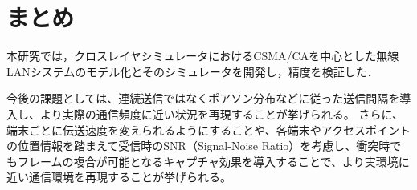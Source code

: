 \documentclass[a4paper, 10pt]{ltjsarticle}
\begin{document}
\vspace{-2em}

\section{まとめ}

本研究では，クロスレイヤシミュレータにおけるCSMA/CAを中心とした無線LANシステムのモデル化とそのシミュレータを開発し，精度を検証した．

今後の課題としては、連続送信ではなくポアソン分布などに従った送信間隔を導入し、より実際の通信頻度に近い状況を再現することが挙げられる。
さらに、端末ごとに伝送速度を変えられるようにすることや、各端末やアクセスポイントの位置情報を踏まえて受信時のSNR（Signal-Noise Ratio）を考慮し、衝突時でもフレームの複合が可能となるキャプチャ効果を導入することで、より実環境に近い通信環境を再現することが挙げられる。








\vspace{-0.5em}
\end{document}
